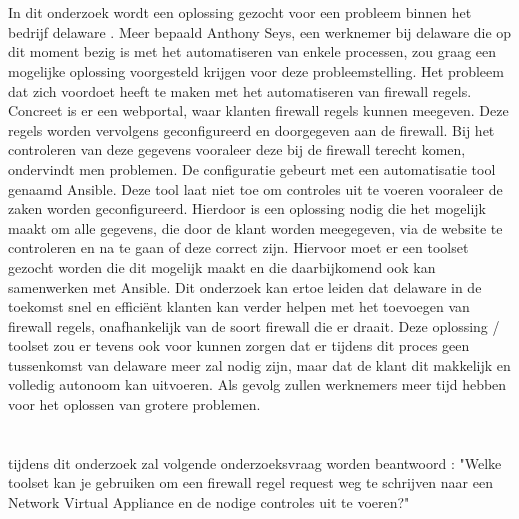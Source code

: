 \section{}%
\label{sec:probleemstelling}
In dit onderzoek wordt een oplossing gezocht voor een probleem binnen het bedrijf delaware . Meer bepaald Anthony Seys, een werknemer bij delaware die op dit moment bezig is met het automatiseren van enkele processen, zou graag een mogelijke oplossing voorgesteld krijgen voor deze probleemstelling. Het probleem dat zich voordoet heeft te maken met het automatiseren van firewall regels. Concreet is er een webportal, waar klanten firewall regels kunnen meegeven. Deze regels worden vervolgens geconfigureerd en doorgegeven aan de firewall. Bij het controleren van deze gegevens vooraleer deze bij de firewall terecht komen, ondervindt men problemen. De configuratie gebeurt met een automatisatie tool genaamd Ansible. Deze tool laat niet toe om controles uit te voeren vooraleer de zaken worden geconfigureerd. Hierdoor is een oplossing nodig   die het mogelijk maakt om alle gegevens, die door de klant worden meegegeven, via de website te controleren en na te gaan of deze correct zijn. Hiervoor moet er een toolset gezocht worden die dit mogelijk maakt en die daarbijkomend ook kan samenwerken met Ansible. Dit onderzoek kan ertoe leiden dat delaware in de toekomst snel en efficiënt klanten kan verder helpen met het toevoegen van firewall regels, onafhankelijk van de soort firewall die er draait. Deze oplossing / toolset zou er tevens ook voor kunnen zorgen dat er tijdens dit proces geen tussenkomst van delaware meer zal nodig zijn, maar dat de klant dit makkelijk en volledig autonoom kan uitvoeren. Als gevolg zullen  werknemers meer tijd hebben voor het oplossen van grotere problemen. \newline




\section{}%
\label{sec:onderzoeksvraag-TODO}
tijdens dit onderzoek zal volgende onderzoeksvraag worden beantwoord : "Welke toolset kan je gebruiken om een firewall regel request weg te schrijven naar een Network Virtual Appliance en de nodige controles uit te voeren?"
